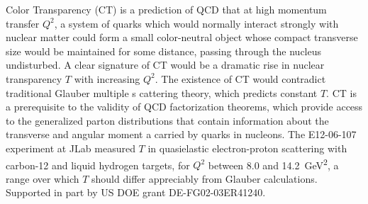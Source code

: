 \noindent
Color Transparency (CT) is a prediction of QCD that at high momentum transfer
$Q ^2$, a system of quarks which would normally interact strongly with nuclear
matter could form a small color-neutral object whose compact transverse size
would be maintained for some distance, passing through the nucleus undisturbed.
A clear signature of CT would be a dramatic rise in nuclear transparency $T$
with increasing $Q^2$. The existence of CT would contradict traditional Glauber
multiple s cattering theory, which predicts constant $T$. CT is a prerequisite
to the validity of QCD factorization theorems, which provide access to the
generalized parton distributions that contain information about the transverse
and angular moment a carried by quarks in nucleons. The E12-06-107 experiment
at JLab measured $T$ in quasielastic electron-proton scattering with carbon-12
and liquid hydrogen targets, for $Q^2$ between 8.0 and
\SI{14.2}{\giga\electronvolt\squared}, a range over which $T$ should differ
appreciably from Glauber calculations. Supported in part by US DOE grant
 DE-FG02-03ER41240.
